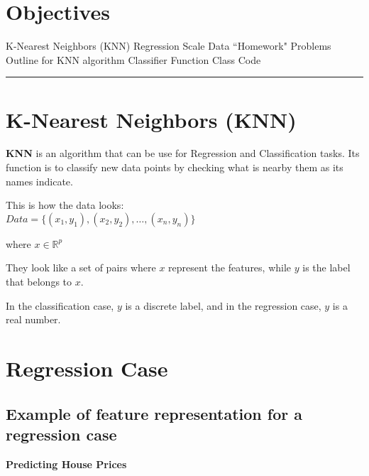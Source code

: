 \section*{Objectives}
\begin{outline}
    \1 K-Nearest Neighbors (KNN)
    \1 Regression
    \1 Scale Data
    \1 ``Homework" Problems
    \1 Outline for KNN algorithm
    \1 Classifier Function
    \1 Class Code
\end{outline}

\rule[0.0051in]{\textwidth}{0.00025in}

\section{K-Nearest Neighbors (KNN)}

\textbf{KNN} is an algorithm that can be use for Regression and Classification tasks. Its function is to classify new data points
by checking what is nearby them as its names indicate.

This is how the data looks:\\
$Data = \{(x_1, y_1), (x_2, y_2), \dots, (x_n, y_n)\}$

where $x \in \mathbb{R}^p$

They look like a set of pairs where $x$ represent the features, while $y$ is the label that belongs to $x$.

In the classification case, $y$ is a discrete label, and in the regression case, $y$ is a real number.


\section{Regression Case}

\subsection{Example of feature representation for a regression case}

\begin{center}
    \textbf{Predicting House Prices}
\end{center}

